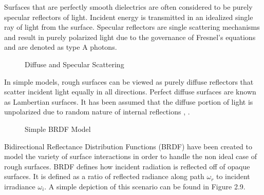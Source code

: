 Surfaces that are perfectly smooth dielectrics are often considered to be purely specular reflectors of light.  Incident energy is transmitted in an idealized single ray of light from the surface.  Specular reflectors are single scattering mechanisms and result in purely polarized light due to the governance of Fresnel’s equations and are denoted as type A photons.
%
\begin{figure}
    \begin{center}
    \end{center}
    \caption{Diffuse and Specular Scattering}
    \label{fig:scattering}
\end{figure}
%
In simple models, rough surfaces can be viewed as purely diffuse reflectors that scatter incident light equally in all directions.  Perfect diffuse surfaces are known as Lambertian surfaces.  It has been assumed that the diffuse portion of light is unpolarized due to random nature of internal reflections \cite{specularclass}, \cite{grant}.
\begin{figure}
    \begin{center}
    \end{center}
    \caption{Simple BRDF Model}
    \label{fig:scattering}
\end{figure}
Bidirectional Reflectance Distribution Functions (BRDF) have been created to model the variety of surface interactions in order to handle the non ideal case of rough surfaces. BRDF defines how incident radiation is reflected off of opaque surfaces.  It is defined as a ratio of reflected radiance along path $\omega_r$ to incident irradiance $\omega_i$. A simple depiction of this scenario can be found in Figure 2.9.

